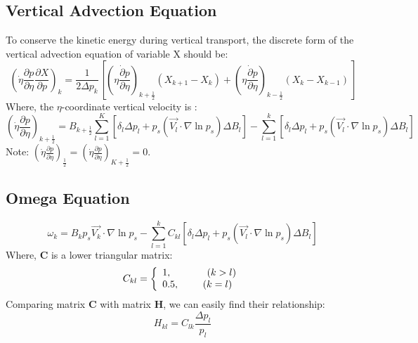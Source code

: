 \documentclass[12pt,a4paper]{book}
\begin{document}
\subsection{Vertical Advection Equation}

To conserve the kinetic energy during vertical transport, the discrete form of the vertical advection equation of variable X should be:
	\begin{equation} \label{eq:gp}
	\left( \dot{\eta} \frac{\partial p}{\partial \eta} \frac{\partial X}{\partial p} \right)_k 
	= \frac{1}{2 \Delta p_k} 
	\left[ 
	  \left( \dot{\eta \frac{\partial p}{\partial \eta}} \right)_{k+\frac{1}{2}} \left( X_{k+1} - X_k  \right) 
	+ \left( \dot{\eta \frac{\partial p}{\partial \eta}} \right)_{k-\frac{1}{2}} \left( X_{k} - X_{k-1}  \right) 
	\right]
	\end{equation}
Where, the $\eta$-coordinate vertical velocity is :
	\begin{equation} \label{eq:etadot}
	\left( \dot{\eta} \frac{\partial p}{\partial \eta} \right)_{k+\frac{1}{2}} 
	= B_{k+\frac{1}{2}} \sum_{l=1}^{K}[\delta_l \Delta p_l + p_s (\vec{V_l} \cdot \nabla \ln p_s) \Delta B_l] 
	-  \sum_{l=1}^{k}[\delta_l \Delta p_l + p_s (\vec{V_l} \cdot \nabla \ln p_s) \Delta B_l] 
	\end{equation}
Note: $\left( \dot{\eta} \frac{\partial p}{\partial \eta} \right)_{\frac{1}{2}} = \left( \dot{\eta} \frac{\partial p}{\partial \eta} \right)_{K+\frac{1}{2}} = 0$.

\subsection{Omega Equation}

	\begin{equation} \label{eq:omega}
	\omega_k = B_k p_s \vec{V_k} \cdot \nabla \ln p_s 
	- \sum_{l=1}^{k} C_{kl} [\delta_l \Delta p_l + p_s (\vec{V_l} \cdot \nabla \ln p_s) \Delta B_l]
	\end{equation}
Where, $\boldsymbol{C}$ is a lower triangular matrix:
	\begin{equation} \label{eq:matrixC}
	C_{kl} = \left\lbrace
	\begin{array}{l}
	1,  \hspace{3 pc} (k>l) \\
	0.5, \hspace{2 pc} (k=l)
	\end{array} \right.
	\end{equation}
Comparing matrix $\boldsymbol{C}$ with matrix $\boldsymbol{H}$, we can easily find their relationship:
	\begin{equation} \label{eq:HandC}
	H_{kl} = C_{lk} \frac{\Delta p_l}{p_l}
	\end{equation}
	
\end{document}
